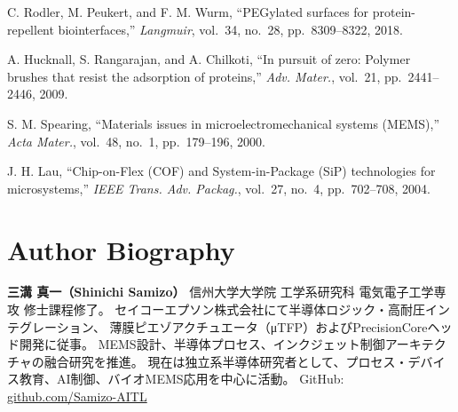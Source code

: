 \documentclass[conference]{IEEEtran}
\begin{document}
\begin{thebibliography}{99}
C. Rodler, M. Peukert, and F. M. Wurm,
``PEGylated surfaces for protein-repellent biointerfaces,''
\emph{Langmuir}, vol.~34, no.~28, pp.~8309--8322, 2018.

A. Hucknall, S. Rangarajan, and A. Chilkoti,
``In pursuit of zero: Polymer brushes that resist the adsorption of proteins,''
\emph{Adv. Mater.}, vol.~21, pp.~2441--2446, 2009.

S. M. Spearing,
``Materials issues in microelectromechanical systems (MEMS),''
\emph{Acta Mater.}, vol.~48, no.~1, pp.~179--196, 2000.

J. H. Lau,
``Chip-on-Flex (COF) and System-in-Package (SiP) technologies for microsystems,''
\emph{IEEE Trans. Adv. Packag.}, vol.~27, no.~4, pp.~702--708, 2004.

\end{thebibliography}

\section*{Author Biography}
\textbf{三溝 真一（Shinichi Samizo）} 信州大学大学院 工学系研究科 電気電子工学専攻 修士課程修了。
セイコーエプソン株式会社にて半導体ロジック・高耐圧インテグレーション、
薄膜ピエゾアクチュエータ（μTFP）およびPrecisionCoreヘッド開発に従事。
MEMS設計、半導体プロセス、インクジェット制御アーキテクチャの融合研究を推進。
現在は独立系半導体研究者として、プロセス・デバイス教育、AI制御、バイオMEMS応用を中心に活動。
GitHub: \href{https://github.com/Samizo-AITL}{github.com/Samizo-AITL}

\balance
\end{document}
